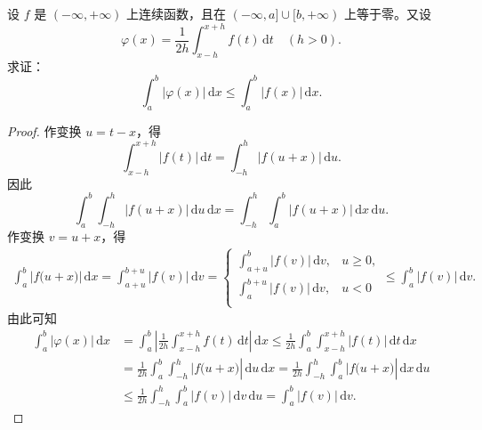 \documentclass[../../main.tex]{subfiles}%
\begin{document}
\begin{example}
设 \( f \) 是 \( (-\infty,+\infty) \) 上连续函数，且在 \( (-\infty,a] \cup [b,+\infty) \) 上等于零。又设
\[
\varphi(x) = \frac{1}{2h} \int_{x-h}^{x+h} f(t) \, \mathrm{d}t \quad (h > 0).
\]
求证：
\[
\int_{a}^{b} |\varphi(x)| \, \mathrm{d}x \leqslant \int_{a}^{b} |f(x)| \, \mathrm{d}x.
\]
\end{example}
\begin{proof}

作变换 \( u = t - x \)，得
\[
\int_{x-h}^{x+h} |f(t)| \, \mathrm{d}t = \int_{-h}^{h} |f(u + x)| \, \mathrm{d}u.
\]
因此
\[
\int_{a}^{b} \int_{-h}^{h} |f(u + x)| \, \mathrm{d}u \, \mathrm{d}x = \int_{-h}^{h} \int_{a}^{b} |f(u + x)| \, \mathrm{d}x \, \mathrm{d}u.
\]
作变换 \( v = u + x \)，得
\begin{align*}
\int_a^b{|f(u}+x)|\,\mathrm{d}x=\int_{a+u}^{b+u}{|f(v)|\,\mathrm{d}v}=\begin{cases}
\int_{a+u}^b{|f(v)|\,\mathrm{d}v,}&		u\geqslant 0,\\
\int_a^{b+u}{|f(v)|\,\mathrm{d}v,}&		u<0\\
\end{cases}\leqslant \int_a^b{|f(v)|\,\mathrm{d}v}.
\end{align*}
由此可知
\begin{align*}
\int_a^b{|\varphi (x)|\,\mathrm{d}x}&=\int_a^b{\left| \frac{1}{2h}\int_{x-h}^{x+h}{f(t)\,\mathrm{d}t} \right|\,\mathrm{d}x}\leqslant \frac{1}{2h}\int_a^b{\int_{x-h}^{x+h}{|f(t)|\,\mathrm{d}t\,\mathrm{d}x}}
\\
&=\frac{1}{2h}\int_a^b{\int_{-h}^h{|f(u}}+x)|\,\mathrm{d}u\,\mathrm{d}x=\frac{1}{2h}\int_{-h}^h{\int_a^b{|f(u}}+x)|\,\mathrm{d}x\,\mathrm{d}u
\\
&\leqslant \frac{1}{2h}\int_{-h}^h{\int_a^b{|f(v)|\,\mathrm{d}v\,\mathrm{d}u}}=\int_a^b{|f(v)|\,\mathrm{d}v}.
\end{align*}

\end{proof}
\end{document}
